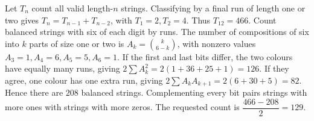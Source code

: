 Let $T_n$ count all valid length-$n$ strings. Classifying by a final run of length one or two gives $T_n=T_{n-1}+T_{n-2}$, with $T_1=2,T_2=4$. Thus $T_{12}=466$.
Count balanced strings with six of each digit by runs. The number of compositions of six into $k$ parts of size one or two is $A_k=\binom{k}{6-k}$, with nonzero values $A_3=1,A_4=6,A_5=5,A_6=1$. If the first and last bits differ, the two colours have equally many runs, giving $2\sum A_k^2=2(1+36+25+1)=126$. If they agree, one colour has one extra run, giving $2\sum A_kA_{k+1}=2(6+30+5)=82$. Hence there are $208$ balanced strings.
Complementing every bit pairs strings with more ones with strings with more zeros. The requested count is $\boxed{\dfrac{466-208}{2}=129}$.
